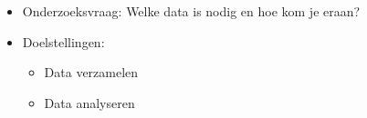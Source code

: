 \documentclass{ou-report}
\newcommand{\outline}[1]{{\color{blue} #1}}
\begin{document}
\outline{
\begin{itemize}
    \item Onderzoeksvraag: Welke data is nodig en hoe kom je eraan?
    \item Doelstellingen:
    \begin{itemize}
        \item Data verzamelen
        \item Data analyseren
    \end{itemize}
\end{itemize}
}








\end{document}
